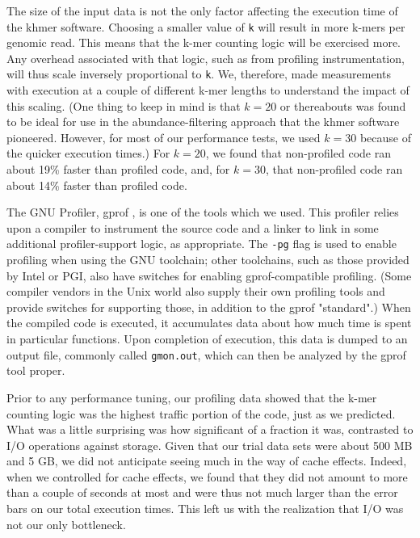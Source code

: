 \documentclass{article}
\begin{document}
The size of the input data is not the only factor affecting the execution time
of the khmer software. Choosing a smaller value of \texttt{k} will result in
more k-mers per genomic read. This means that the k-mer counting logic will be
exercised more. Any overhead associated with that logic, such as from profiling
instrumentation, will thus scale inversely proportional to \texttt{k}. We,
therefore, made measurements with execution at a couple of different k-mer
lengths to understand the impact of this scaling. (One thing to keep in mind is
that $k = 20$ or thereabouts was found to be ideal for use in the
abundance-filtering approach that the khmer software pioneered.  However, for
most of our performance tests, we used $k = 30$ because of the quicker
execution times.) For $k = 20$, we found that non-profiled code ran about 19\%
faster than profiled code, and, for $k = 30$, that non-profiled code ran about
14\% faster than profiled code.

The GNU Profiler, gprof \citep{web:gprof}, is one of the tools which we used.
This profiler relies upon a compiler to instrument the source code and a linker
to link in some additional profiler-support logic, as appropriate. The
\texttt{-pg} flag is used to enable profiling when using the GNU toolchain;
other toolchains, such as those provided by Intel or PGI, also have switches
for enabling gprof-compatible profiling. (Some compiler vendors in the Unix
world also supply their own profiling tools and provide switches for supporting
those, in addition to the gprof "standard".) When the compiled code is
executed, it accumulates data about how much time is spent in particular
functions. Upon completion of execution, this data is dumped to an output file,
commonly called \texttt{gmon.out}, which can then be analyzed by the gprof tool
proper.

Prior to any performance tuning, our profiling data showed that the k-mer
counting logic was the highest traffic portion of the code, just as we
predicted. What was a little surprising was how significant of a fraction it
was, contrasted to I/O operations against storage. Given that our trial data
sets were about 500 MB and 5 GB, we did not anticipate seeing much in the way
of cache effects. Indeed, when we controlled for cache effects, we found that
they did not amount to more than a couple of seconds at most and were thus not
much larger than the error bars on our total execution times. This left us with
the realization that I/O was not our only bottleneck.
\end{document}
